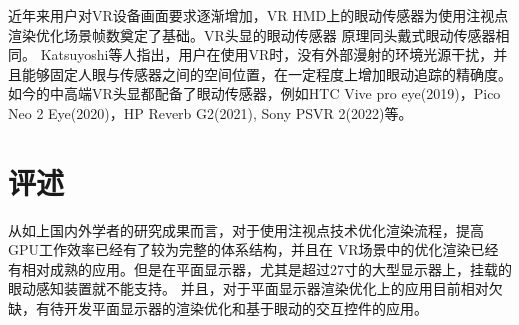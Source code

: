 \documentclass[]{ctexart}
\begin{document}
		近年来用户对VR设备画面要求逐渐增加，VR HMD上的眼动传感器为使用注视点渲染优化场景帧数奠定了基础。VR头显的眼动传感器
		原理同头戴式眼动传感器相同。
		Katsuyoshi等人指出，用户在使用VR时，没有外部漫射的环境光源干扰，并且能够固定人眼与传感器之间的空间位置，在一定程度上增加眼动追踪的精确度\cite{8798030}。
		如今的中高端VR头显都配备了眼动传感器，例如HTC Vive pro eye(2019)，Pico Neo 2 Eye(2020)，HP Reverb G2(2021),
		Sony PSVR 2(2022)等。
		
	\section{评述}
		从如上国内外学者的研究成果而言，对于使用注视点技术优化渲染流程，提高GPU工作效率已经有了较为完整的体系结构，并且在
		VR场景中的优化渲染已经有相对成熟的应用。但是在平面显示器，尤其是超过27寸的大型显示器上，挂载的眼动感知装置就不能支持。
		并且，对于平面显示器渲染优化上的应用目前相对欠缺，有待开发平面显示器的渲染优化和基于眼动的交互控件的应用。
		
	
	
\end{document}
